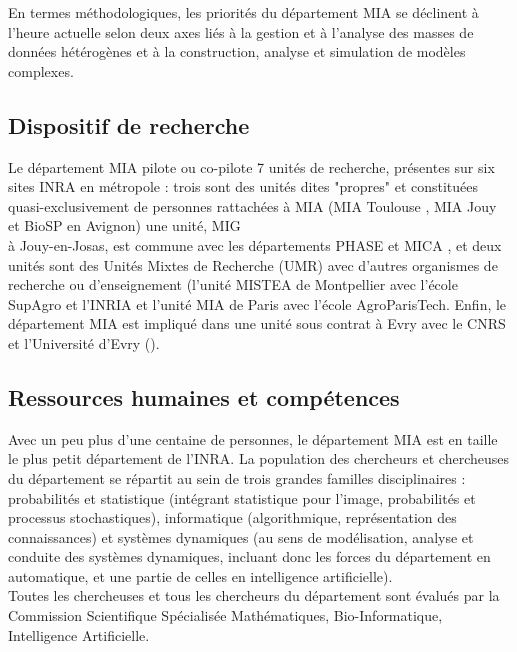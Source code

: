 En termes m\'ethodologiques, les priorit\'es du d\'epartement MIA se d\'eclinent \`a l'heure actuelle selon deux axes li\'es \`a la gestion et \`a l'analyse des masses de donn\'ees h\'et\'erog\`enes et \`a la construction, analyse et simulation de mod\`eles complexes.

\subsection{ Dispositif de recherche}

 Le d\'epartement MIA pilote ou co-pilote 7 unit\'es de recherche, pr\'esentes sur six sites INRA en m\'etropole : trois sont des unit\'es dites "propres" et constitu\'ees quasi-exclusivement de   personnes rattach\'ees \`a MIA (MIA Toulouse  , MIA Jouy \\   et BioSP  en Avignon) une unit\'e, MIG\\  \`a Jouy-en-Josas, est commune avec les d\'epartements PHASE et MICA , et deux unit\'es sont des Unit\'es Mixtes de Recherche (UMR) avec d'autres organismes de recherche ou d'enseignement (l'unit\'e MISTEA de Montpellier   avec l'\'ecole SupAgro et l'INRIA et l'unit\'e MIA de Paris  avec l'\'ecole AgroParisTech. Enfin, le d\'epartement MIA est impliqu\'e dans une unit\'e sous contrat \`a Evry avec le CNRS et l'Universit\'e d'Evry ().

\subsection{ Ressources humaines et comp\'etences}
Avec un peu plus d'une centaine de personnes, le d\'epartement MIA est en taille le plus petit d\'epartement de l'INRA. La population des chercheurs et chercheuses du d\'epartement se r\'epartit au sein de trois grandes familles disciplinaires : probabilit\'es et statistique (int\'egrant statistique pour l'image, probabilit\'es et processus stochastiques), informatique (algorithmique, repr\'esentation des connaissances) et syst\`emes dynamiques (au sens de mod\'elisation, analyse et conduite des syst\`emes dynamiques, incluant donc les forces du d\'epartement en automatique, et une partie de celles en intelligence artificielle).\\
Toutes les chercheuses et tous les chercheurs du d\'epartement sont \'evalu\'es par la Commission Scientifique Sp\'ecialis\'ee Math\'ematiques, Bio-Informatique, Intelligence Artificielle.

